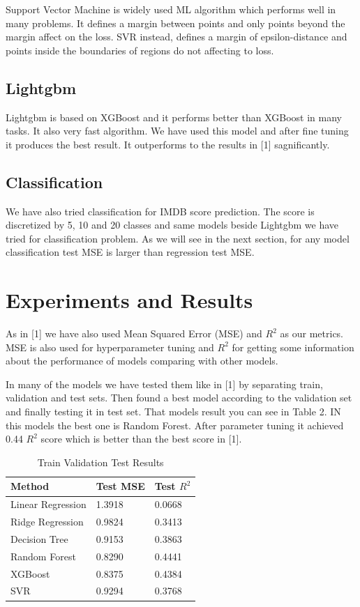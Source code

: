 \documentclass{article}
\begin{document}
Support Vector Machine is widely used ML algorithm which performs well in many problems. It defines a margin between points and only points beyond the margin affect on the loss. SVR instead, defines a margin of epsilon-distance and points inside the boundaries of regions do not affecting to loss. 

\subsection{Lightgbm}

Lightgbm is based on XGBoost and it performs better than XGBoost in many tasks. It also very fast algorithm. We have used this model and after fine tuning it produces the best result. It outperforms to the results in [1] sagnificantly. 

\subsection{Classification}
We have also tried classification for IMDB score prediction. The score is discretized by 5, 10 and 20 classes and same models beside Lightgbm we have tried for classification problem. As we will see in the next section, for any model classification test MSE is larger than regression test MSE.

\section{Experiments and Results}

As in [1] we have also used Mean Squared Error (MSE) and $R^2$ as our metrics. MSE is also used for hyperparameter tuning and $R^2$ for getting some information about the performance of models comparing with other models. 

In many of the models we have tested them like in [1] by separating train, validation and test sets. Then found a best model according to the validation set and finally testing it in test set. That models result you can see in Table 2. IN this models the best one is Random Forest. After parameter tuning it achieved 0.44 $R^2$ score which is better than the best score in [1]. 

\begin{table}
  \caption{Train Validation Test Results}
  \label{tvt_results-table}
  \centering
  \begin{tabular}{lll}
    \toprule
    Method & Test MSE &  Test $R^2$  \\
    \midrule
    Linear Regression & 1.3918  & 0.0668   \\
    Ridge Regression & 0.9824  & 0.3413   \\
    Decision Tree & 0.9153  & 0.3863   \\
    Random Forest & 0.8290  & 0.4441   \\
    XGBoost & 0.8375 & 0.4384 \\
    SVR & 0.9294 & 0.3768 \\
        \bottomrule
  \end{tabular}
\end{table}
\end{document}
